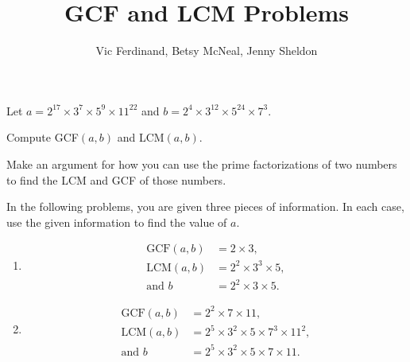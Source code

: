 \documentclass{ximera}
\title{GCF and LCM Problems}
\author{Vic Ferdinand, Betsy McNeal, Jenny Sheldon}
\begin{document}
\begin{abstract} \end{abstract}
\maketitle




\begin{problem} \label{GCFLCM1}

Let
$a = 2^{17}\times 3^7 \times 5^9 \times 11^{22}$ and $b =  2^{4}\times 3^{12} \times 5^{24} \times 7^{3}$.

Compute GCF$(a,b)$ and LCM$(a,b)$.

\end{problem}

\begin{problem}\label{GCFLCM2}
Make an argument for how you can use the prime factorizations of two
numbers to find the LCM and GCF of those numbers.
\end{problem}
\vfill
\newpage

\begin{problem} \label{GCFLCM3}
In the following problems, you are given three pieces of
information. In each case, use the given information to find the value
of $a$.

\begin{enumerate}
\item 
\begin{align*}
  \text{GCF}(a,b) &= 2 \times 3,\\ \text{LCM}(a,b) &= 2^2 \times
  3^3 \times 5,\\ \text{and } b &= 2^2 \times 3 \times 5.
\end{align*}

\vfill
\item  
\begin{align*}
  \text{GCF}(a,b) &= 2^2 \times 7 \times 11,\\
  \text{LCM}(a,b) &= 2^5 \times 3^2 \times 5 \times 7^3 \times 11^2,\\
  \text{and }   b &= 2^5 \times 3^2 \times 5 \times 7 \times 11.
\end{align*}
\vfill
\end{enumerate}
\end{problem}

\newpage
\end{document}
